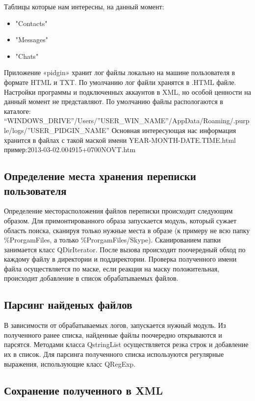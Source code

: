 Таблицы которые нам интересны, на данный момент:    

\begin{itemize}
\item"Contacts"
\item"Messages"
\item"Chats" 
\end{itemize}

Приложение «pidgin» хранит лог файлы локально на машине пользователя в формате HTML и TXT. По умолчанию лог файли хранятся в .HTML файле. Настройки программы и подключенных аккаунтов в XML, но особой ценности на данный момент не представляют.
По умолчанию файлы распологаются в каталоге:\\“WINDOWS\_DRIVE”/Users/”USER\_WIN\_NAME”/AppData/Roaming/.purple/logs/”USER\_PIDGIN\_NAME”
Основная интересующая нас информация хранится в файлах с такой маской имени YEAR-MONTH-DATE.TIME.html пример:2013-03-02.004915+0700NOVT.htm

\subsection{Определение места хранения переписки пользователя}

Определение месторасположения файлов переписки происходит следующим образом. Для примонтированного образа запускается модуль, который сужает область поиска, сканируя только нужные места в образе (к примеру не всю папку \%ProrgamFiles, а только \%ProrgamFiles/Skype). Сканированием папки занимается класс QDirIterator. После вызова происходит поочередный обход по каждому файлу в директории и поддиректории. Проверка полученного имени файла  осуществляется по маске, если реакция на маску положительная, происходит добавление в список обрабатываемых файлов. 


\subsection{Парсинг найденых файлов}

В зависимости от обрабатываемых логов, запускается нужный модуль. Из полученного ранее списка, найденные файлы поочередно открываются и парсятся. Методами класса QstringList осуществляется резка строк и добавление их в список. Для парсинга полученного списка используются регулярные выражения, использующие класс QRegExp. 

\subsection{Сохранение полученного в XML}

